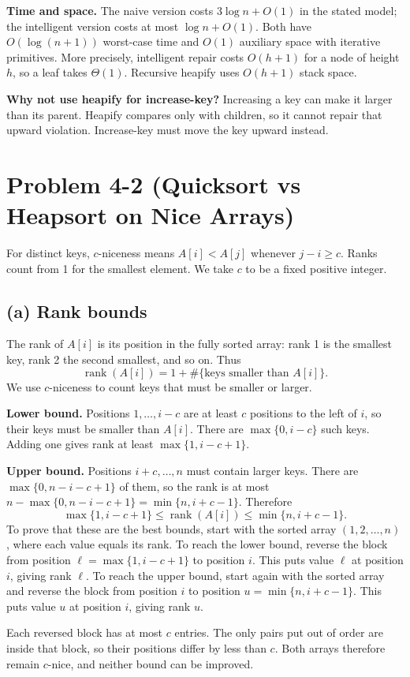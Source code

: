 \documentclass[11pt,a4paper]{article}
\newcommand{\parttitle}[1]{\Needspace{10\baselineskip}\subsection*{#1}}
\begin{document}
\textbf{Time and space.} The naive version costs $3\log n+O(1)$ in the stated model; the intelligent version costs at most $\log n+O(1)$. Both have $O(\log(n+1))$ worst-case time and $O(1)$ auxiliary space with iterative primitives. More precisely, intelligent repair costs $O(h+1)$ for a node of height $h$, so a leaf takes $\Theta(1)$. Recursive heapify uses $O(h+1)$ stack space.

\textbf{Why not use heapify for increase-key?} Increasing a key can make it larger than its parent. Heapify compares only with children, so it cannot repair that upward violation. Increase-key must move the key upward instead.

\newpage
\section*{Problem 4-2 (Quicksort vs Heapsort on Nice Arrays)}
For distinct keys, $c$-niceness means $A[i]<A[j]$ whenever $j-i\ge c$. Ranks count from 1 for the smallest element. We take $c$ to be a fixed positive integer.

\parttitle{(a) Rank bounds}
The rank of $A[i]$ is its position in the fully sorted array: rank 1 is the smallest key, rank 2 the second smallest, and so on. Thus
\[
\operatorname{rank}(A[i])=1+\#\{\text{keys smaller than }A[i]\}.
\]
We use $c$-niceness to count keys that must be smaller or larger.

\textbf{Lower bound.} Positions $1,\ldots,i-c$ are at least $c$ positions to the left of $i$, so their keys must be smaller than $A[i]$. There are $\max\{0,i-c\}$ such keys. Adding one gives rank at least $\max\{1,i-c+1\}$.

\textbf{Upper bound.} Positions $i+c,\ldots,n$ must contain larger keys. There are $\max\{0,n-i-c+1\}$ of them, so the rank is at most $n-\max\{0,n-i-c+1\}=\min\{n,i+c-1\}$. Therefore
\[
\boxed{\max\{1,i-c+1\}\le\operatorname{rank}(A[i])
\le\min\{n,i+c-1\}.}
\]
To prove that these are the best bounds, start with the sorted array $(1,2,\ldots,n)$, where each value equals its rank. To reach the lower bound, reverse the block from position $\ell=\max\{1,i-c+1\}$ to position $i$. This puts value $\ell$ at position $i$, giving rank $\ell$. To reach the upper bound, start again with the sorted array and reverse the block from position $i$ to position $u=\min\{n,i+c-1\}$. This puts value $u$ at position $i$, giving rank $u$.

Each reversed block has at most $c$ entries. The only pairs put out of order are inside that block, so their positions differ by less than $c$. Both arrays therefore remain $c$-nice, and neither bound can be improved.
\end{document}
